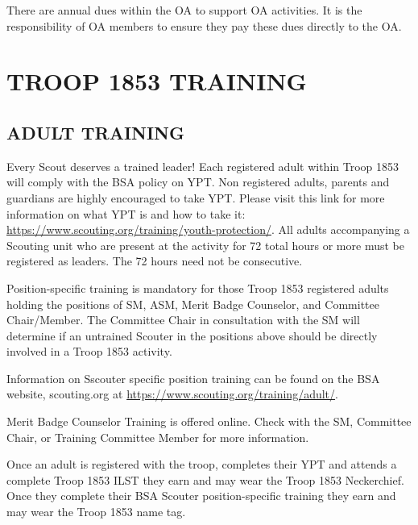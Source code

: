 \documentclass{ltxguide}
\begin{document}
There are annual dues within the OA to support OA activities. It is the responsibility of OA members to ensure they pay these dues directly to the OA.


\section{TROOP 1853 TRAINING}
\subsection{ADULT TRAINING} Every Scout deserves a trained leader!
Each registered adult within Troop 1853 will comply with the \ac{BSA} policy on \ac{YPT}. Non registered adults, parents and guardians are highly encouraged to take \ac{YPT}. Please visit this link for more information on what \ac{YPT} is and how to take it:  \url{https://www.scouting.org/training/youth-protection/}.
All adults accompanying a Scouting unit who are present at the activity for 72 total hours or more must be registered as leaders. The 72 hours need not be consecutive.

Position-specific training is mandatory for those Troop 1853 registered adults holding the positions of \ac{SM}, \ac{ASM}, Merit Badge Counselor, and Committee Chair/Member. The Committee Chair in consultation with the \ac{SM} will determine if an untrained Scouter in the positions above should be directly involved in a Troop 1853 activity.

Information on Sscouter specific position training can be found on the \ac{BSA} website, scouting.org at \url{https://www.scouting.org/training/adult/}.

Merit Badge Counselor Training is offered online. Check with the \ac{SM}, Committee Chair, or Training Committee Member for more information.

Once an adult is registered with the troop, completes their YPT and attends a complete Troop 1853 ILST they earn and may wear the Troop 1853 Neckerchief. Once they complete their \ac{BSA} Scouter position-specific training they earn and may wear the Troop 1853 name tag.
\end{document}
